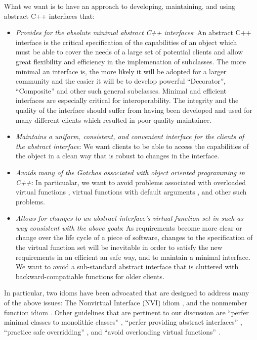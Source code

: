 \documentclass[pdf,ps2pdf,11pt]{SANDreport}
\begin{document}
What we want is to have an approach to developing, maintaining, and using
abstract C++ interfaces that:

\begin{itemize}

{}\item\textit{Provides for the absolute minimal abstract C++ interfaces}: An
abstract C++ interface is the critical specification of the capabilities of an
object which must be able to cover the needs of a large set of potential
clients and allow great flexibility and efficiency in the implemenation of
subclasses.  The more minimal an interface is, the more likely it will be
adopted for a larger community and the easier it will be to develop powerful
``Decorator'', ``Composite'' and other such general subclasses.  Minimal and
efficient interfaces are especially critical for interoperability.  The
integrity and the quality of the interface should suffer from having been
developed and used for many different clients which resulted in poor quality
maintaince.

{}\item\textit{Maintains a uniform, consistent, and convenient interface for
the clients of the abstract interface}: We want clients to be able to access
the capabilities of the object in a clean way that is robust to changes in the
interface.

{}\item\textit{Avoids many of the Gotchas associated with object oriented
programming in C++}: In particualar, we want to avoid problems associated with
overloaded virtual functions {}\cite[Item ???]{C++Gotchas???}, virtual
functions with default arguments {}\cite[Item ???]{C++Gotchas???}, and other
such problems.

{}\item\textit{Allows for changes to an abstract interface's virtual function
set in such as way consistent with the above goals}: As requirements become
more clear or change over the life cycle of a piece of software, changes to
the specification of the virtual function set will be inevitable in order to
satisfy the new requirements in an efficient an safe way, and to maintain a
minimal interface.  We want to avoid a sub-standard abstract interface that is
cluttered with backward-compatiable functions for older clients.

\end{itemize}

In particular, two idoms have been advocated that are designed to address many
of the above issues: The Nonvirtual Interface (NVI) idiom {}\cite[Item
39]{C++CodingStandards05}, and the nonmember function idiom {}\cite[Item
44]{C++CodingStandards05}.  Other guidelines that are pertinent to our
discussion are ``perfer minimal classes to monolithic classes'' {}\cite[Item
33]{C++CodingStandards05}, ``perfer providing abstract interfaces''
{}\cite[Item 36]{C++CodingStandards05}, ``practice safe overridding''
{}\cite[Item 38]{C++CodingStandards05} {}\cite[Gotcha 74]{C++Gotchas03}, and
``avoid overloading virtual functions'' {}\cite[Gotcha 73]{C++Gotchas03}.
\end{document}
